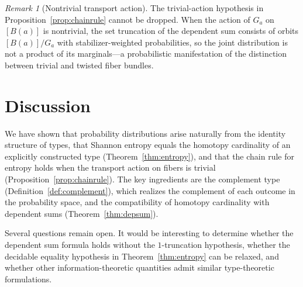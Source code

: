 \documentclass[12pt]{amsart}
\theoremstyle{plain}
\theoremstyle{definition}
\theoremstyle{remark}
\newtheorem{remark}[theorem]{Remark}
\begin{document}
\begin{remark}[Nontrivial transport action]\label{rem:nontrivial-action}
The trivial-action hypothesis in Proposition~\ref{prop:chainrule} cannot be dropped. When the action of $G_a$ on $[B(a)]$ is nontrivial, the set truncation of the dependent sum consists of orbits $[B(a)]/G_a$ with stabilizer-weighted probabilities, so the joint distribution is not a product of its marginals---a probabilistic manifestation of the distinction between trivial and twisted fiber bundles.
\end{remark}

\section{Discussion}

We have shown that probability distributions arise naturally from the identity structure of types, that Shannon entropy equals the homotopy cardinality of an explicitly constructed type (Theorem~\ref{thm:entropy}), and that the chain rule for entropy holds when the transport action on fibers is trivial (Proposition~\ref{prop:chainrule}). The key ingredients are the complement type (Definition~\ref{def:complement}), which realizes the complement of each outcome in the probability space, and the compatibility of homotopy cardinality with dependent sums (Theorem~\ref{thm:depsum}).

Several questions remain open. It would be interesting to determine whether the dependent sum formula holds without the $1$-truncation hypothesis, whether the decidable equality hypothesis in Theorem~\ref{thm:entropy} can be relaxed, and whether other information-theoretic quantities admit similar type-theoretic formulations.
\end{document}
